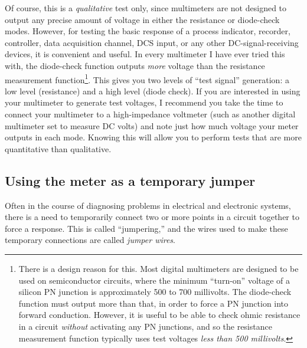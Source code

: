 Of course, this is a \textit{qualitative} test only, since multimeters are not designed to output any precise amount of voltage in either the resistance or diode-check modes.  However, for testing the basic response of a process indicator, recorder, controller, data acquisition channel, DCS input, or any other DC-signal-receiving devices, it is convenient and useful.  In every multimeter I have ever tried this with, the diode-check function outputs \textit{more} voltage than the resistance measurement function\footnote{There is a design reason for this.  Most digital multimeters are designed to be used on semiconductor circuits, where the minimum ``turn-on'' voltage of a silicon PN junction is approximately 500 to 700 millivolts.  The diode-check function must output more than that, in order to force a PN junction into forward conduction.  However, it is useful to be able to check ohmic resistance in a circuit \textit{without} activating any PN junctions, and so the resistance measurement function typically uses test voltages \textit{less than 500 millivolts}.}.  This gives you two levels of ``test signal'' generation: a low level (resistance) and a high level (diode check).  If you are interested in using your multimeter to generate test voltages, I recommend you take the time to connect your multimeter to a high-impedance voltmeter (such as another digital multimeter set to measure DC volts) and note just how much voltage your meter outputs in each mode.  Knowing this will allow you to perform tests that are more quantitative than qualitative.














\filbreak
\subsection{Using the meter as a temporary jumper}

Often in the course of diagnosing problems in electrical and electronic systems, there is a need to temporarily connect two or more points in a circuit together to force a response.  This is called ``jumpering,'' and the wires used to make these temporary connections are called \textit{jumper wires}.    

